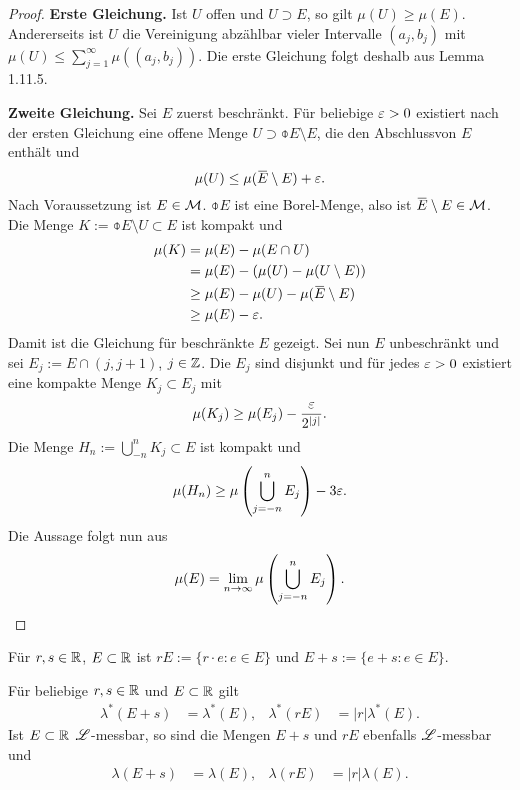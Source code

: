 \begin{proof}
 \textbf{Erste Gleichung.} Ist $U$ offen und $U \supset E$, so gilt $\mu(U) \ge
 \mu(E)$. Andererseits ist $U$ die Vereinigung abzählbar vieler Intervalle
 $(a_j,b_j)$ mit $\mu(U) \le \sum_{j=1}^\infty \mu((a_j, b_j))$. Die erste
 Gleichung folgt deshalb aus Lemma 1.11.5.
 
 \textbf{Zweite Gleichung.} Sei $E$ zuerst beschränkt. Für beliebige $\varepsilon > 0$
 existiert nach der ersten Gleichung eine offene Menge $U \supset \obar{E}
 \setminus E$, die den Abschluss\footnotemark von $E$ enthält und
 \[ \mu(U) \le \mu( \obar{E} \setminus E ) + \eps. \]
 Nach Voraussetzung ist $E \in \mathcal{M}$. $\obar{E}$ ist eine Borel-Menge, also ist
 $\obar{E} \setminus E \in \meas$. Die Menge $K := \obar{E} \setminus U \subset
 E$ ist kompakt und
 \[ \begin{aligned}
     \mu(K) 
     &= \mu(E) - \mu(E \cap U) \\
     &= \mu(E) - ( \mu(U) - \mu(U \setminus E) ) \\
     &\ge \mu(E) - \mu(U) - \mu(\obar{E} \setminus E) \\
     &\ge \mu(E) - \eps.
    \end{aligned} \]
 Damit ist die Gleichung für beschränkte $E$ gezeigt. Sei nun $E$ unbeschränkt
 und sei $E_j := E \cap (j,j+1)$, $j \in \mathbb{Z}$. Die $E_j$ sind disjunkt und
 für jedes $\varepsilon > 0$ existiert eine kompakte Menge $K_j \subset E_j$ mit
 \[ \mu(K_j) \ge \mu(E_j) - \frac{\varepsilon}{2^{|j|}}. \]
 Die Menge $H_n := \bigcup_{-n}^n K_j \subset E$ ist kompakt und
 \[ \mu( H_n ) \ge \mu \left( \bigcup_{j=-n}^n E_j \right) - 3 \varepsilon. \]
 Die Aussage folgt nun aus
 \[ \mu(E) = \lim_{n \to \infty} \mu \left( \bigcup_{j=-n}^n E_j \right). \qedhere\]
\end{proof}

Für $r,s \in \mathbb{R}$, $E \subset \mathbb{R}$ ist $rE := \{ r\cdot e : e \in E \}$ und $E+s:= \{ e+s : e \in E \}$.

\begin{thm}
 Für beliebige $r,s \in \mathbb{R}$ und $E \subset \mathbb{R}$ gilt
 \begin{align*}
  \lambda^* (E+s) &= \lambda^* (E), & \lambda^* (rE) &= |r| \lambda^* (E).
 \end{align*}
 Ist $E \subset \mathbb{R}$ $\mathscr{L}$-messbar, so sind die Mengen $E+s$ und $rE$ ebenfalls $\mathscr{L}$-messbar und
 \begin{align*}
  \lambda (E+s) &= \lambda (E), & \lambda(rE) &= |r| \lambda(E).
 \end{align*}
\end{thm}


